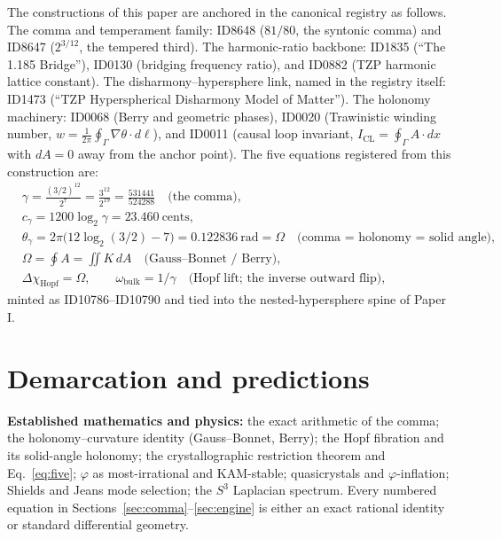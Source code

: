 \documentclass[11pt]{article}
\theoremstyle{remark}
\begin{document}
The constructions of this paper are anchored in the canonical registry as follows. The comma and temperament family: ID8648 ($81/80$, the syntonic comma) and ID8647 ($2^{3/12}$, the tempered third). The harmonic-ratio backbone: ID1835 (``The 1.185 Bridge''), ID0130 (bridging frequency ratio), and ID0882 (TZP harmonic lattice constant). The disharmony--hypersphere link, named in the registry itself: ID1473 (``TZP Hyperspherical Disharmony Model of Matter''). The holonomy machinery: ID0068 (Berry and geometric phases), ID0020 (Trawinistic winding number, $w = \frac{1}{2\pi}\oint_\Gamma \nabla\theta \cdot d\ell$), and ID0011 (causal loop invariant, $I_{\mathrm{CL}} = \oint_\Gamma A \cdot dx$ with $dA = 0$ away from the anchor point). The five equations registered from this construction are:
\begin{align}
&\gamma = \frac{(3/2)^{12}}{2^7} = \frac{3^{12}}{2^{19}} = \frac{531441}{524288} \quad \text{(the comma)},\\
&c_\gamma = 1200\log_2\gamma = 23.460\ \text{cents},\\
&\theta_\gamma = 2\pi\big(12\log_2(3/2) - 7\big) = 0.122836\ \text{rad} = \Omega \quad \text{(comma = holonomy = solid angle)},\\
&\Omega = \oint A = \iint K\, dA \quad \text{(Gauss--Bonnet / Berry)},\\
&\Delta\chi_{\mathrm{Hopf}} = \Omega, \qquad \omega_{\mathrm{bulk}} = 1/\gamma \quad \text{(Hopf lift; the inverse outward flip)},
\end{align}
minted as ID10786--ID10790 and tied into the nested-hypersphere spine of Paper I.

\section{Demarcation and predictions}
\label{sec:demarcation}

\textbf{Established mathematics and physics:} the exact arithmetic of the comma; the holonomy--curvature identity (Gauss--Bonnet, Berry); the Hopf fibration and its solid-angle holonomy; the crystallographic restriction theorem and Eq.~\eqref{eq:five}; $\varphi$ as most-irrational and KAM-stable; quasicrystals and $\varphi$-inflation; Shields and Jeans mode selection; the $S^3$ Laplacian spectrum. Every numbered equation in Sections~\ref{sec:comma}--\ref{sec:engine} is either an exact rational identity or standard differential geometry.
\end{document}
